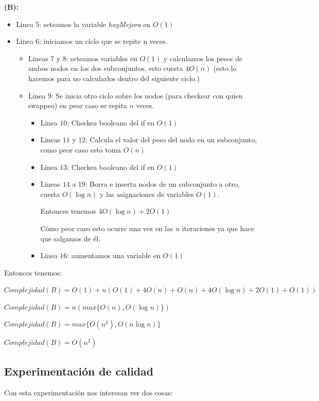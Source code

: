 \textbf{(B):}

\begin{itemize}
    \item Linea $5$: seteamos la variable \textit{hayMejora} en $O(1)$
    \item Linea $6$: iniciamos un ciclo que se repite n veces.
    \begin{itemize}
        \item Lineas $7$ y $8$: seteamos variables en $O(1)$ y calculamos los pesos de ambos nodos en los dos subconjuntos, esto cuesta $4O(n)$ (esto lo hacemos para no calcularlos dentro del siguiente ciclo.)
        \item Linea $9$: Se inicia otro ciclo sobre los nodos (para checkear con quien swappeo) en peor caso se repita $n$ veces.
        \begin{itemize}
            \item Linea $10$: Checkea booleano del if en $O(1)$
            \item Lineas $11$ y $12$: Calcula el valor del peso del nodo en un subconjunto, como peor caso esto toma $O(n)$
            \item Linea $13$: Checkea booleano del if en $O(1)$
            \item Lineas $14$ a $19$: Borra e inserta nodos de un subconjunto a otro, cuesta $O(\log n)$ y las asignaciones de variables $O(1)$. 

            Entonces tenemos $4O(\log n) + 2O(1)$

            Cómo peor caso esto ocurre una vez en las $n$ iteraciones ya que hace que salgamos de él.
            \item Linea $16$: aumentamos una variable en $O(1)$
        \end{itemize}
    \end{itemize}
\end{itemize}

Entonces tenemos:
\begin{center}
    $Complejidad(B) = O(1) + n(O(1)+4O(n)+O(n)+4O(\log n)+2O(1)+O(1))$

    $Complejidad(B) = n(max\{O(n),O(\log n)\})$

    $Complejidad(B) = max\{O(n^2),O(n\log n)\}$

    $Complejidad(B) = O(n^2)$
\end{center}

\subsection{Experimentación de calidad}
Con esta experimentación nos interesan ver dos cosas:


